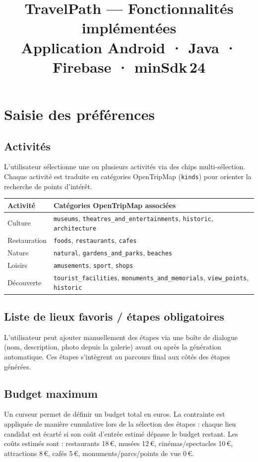 \documentclass[a4paper,11pt]{article}
\title{\textbf{TravelPath — Fonctionnalités implémentées}\\[4pt]
\large Application Android · Java · Firebase · minSdk\,24}
\author{}
\date{}
\begin{document}
\maketitle
\tableofcontents
\newpage

\section{Saisie des préférences}

\subsection{Activités}
L'utilisateur sélectionne une ou plusieurs activités via des chips multi-sélection.
Chaque activité est traduite en catégories OpenTripMap (\texttt{kinds}) pour orienter
la recherche de points d'intérêt.

\begin{center}
\begin{tabular}{ll}
  \toprule
  Activité & Catégories OpenTripMap associées \\
  \midrule
  Culture      & \texttt{museums}, \texttt{theatres\_and\_entertainments},
                 \texttt{historic}, \texttt{architecture} \\
  Restauration & \texttt{foods}, \texttt{restaurants}, \texttt{cafes} \\
  Nature       & \texttt{natural}, \texttt{gardens\_and\_parks}, \texttt{beaches} \\
  Loisirs      & \texttt{amusements}, \texttt{sport}, \texttt{shops} \\
  Découverte   & \texttt{tourist\_facilities}, \texttt{monuments\_and\_memorials},
                 \texttt{view\_points}, \texttt{historic} \\
  \bottomrule
\end{tabular}
\end{center}

\subsection{Liste de lieux favoris / étapes obligatoires}
L'utilisateur peut ajouter manuellement des étapes via une boîte de dialogue
(nom, description, photo depuis la galerie) avant ou après la génération automatique.
Ces étapes s'intègrent au parcours final aux côtés des étapes générées.

\subsection{Budget maximum}
Un curseur permet de définir un budget total en euros.
La contrainte est appliquée de manière cumulative lors de la sélection des étapes :
chaque lieu candidat est écarté si son coût d'entrée estimé dépasse le budget restant.
Les coûts estimés sont : restaurants 18\,€, musées 12\,€, cinémas/spectacles 10\,€,
attractions 8\,€, cafés 5\,€, monuments/parcs/points de vue 0\,€.
\end{document}
